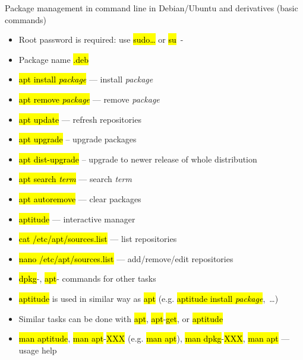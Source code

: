 \documentclass[compress, ucs, xelatex, 11pt, xcolor=svgnames, aspectratio=169,
	hyperref={
		bookmarks=true,
		unicode=true,
		colorlinks=true,
		pdftitle={Linux, command line and MetaCentrum},
		plainpages=false,
		pdfauthor={Vojtech Zeisek},
		pdfsubject={Course about use of Linux command line, writing shell scripts and using MetaCentrum of CESNET},
		pdfcreator={XeLaTeX},
		pdfkeywords={Linux, GNU, BASH, shell, command line, MetaCentrum},
		linkcolor=DarkRed, %
		anchorcolor=DarkBlue, %
		citecolor=Indigo, %
		filecolor=NavyBlue, %
		menucolor=DarkMagenta, %
		urlcolor=DarkBlue, %
		pdftex},
	url={hyphens, lowtilde} %
	]{beamer}
\renewcommand{\texttt}[1]{\hl{\ttfamily #1}}
\begin{document}
\begin{frame}[allowframebreaks]{Package management in command line in Debian/Ubuntu and derivatives (basic commands)}
	\begin{itemize}
		\item Root password is required: use \texttt{sudo\ldots} or \texttt{su}~-
		\item Package name \texttt{*.deb}
		\item \texttt{apt install \textit{package}} --- install \textit{package}
		\item \texttt{apt remove \textit{package}} --- remove \textit{package}
		\item \texttt{apt update} --- refresh repositories
		\item \texttt{apt upgrade} -- upgrade packages
		\item \texttt{apt dist-upgrade} -- upgrade to newer release of whole distribution
		\item \texttt{apt search \textit{term}} --- search \textit{term}
		\item \texttt{apt autoremove} --- clear packages
		\item \texttt{aptitude} --- interactive manager
		\item \texttt{cat /etc/apt/sources.list} --- list repositories
		\item \texttt{nano /etc/apt/sources.list} --- add/remove/edit repositories
		\item \texttt{dpkg}-\texttt{*}, \texttt{apt}-\texttt{*} commands for other tasks
		\item \texttt{aptitude} is used in similar way as \texttt{apt} (e.g. \texttt{aptitude install \textit{package}},~\ldots)
		\item Similar tasks can be done with \texttt{apt}, \texttt{apt}-\texttt{get}, or \texttt{aptitude}
		\item \texttt{man aptitude}, \texttt{man apt}-\texttt{XXX} (e.g. \texttt{man apt}), \texttt{man dpkg}-\texttt{XXX}, \texttt{man apt} --- usage help
	\end{itemize}
\end{frame}
\end{document}
